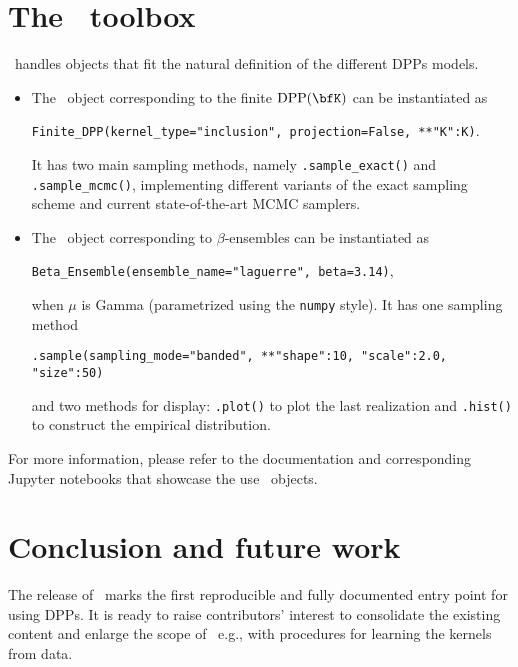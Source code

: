 \documentclass[twoside,11pt]{article}
\begin{document}

\section{The \DPPy\ toolbox} %
\label{sec:the_dppy_toolbox}

  \DPPy\ handles objects that fit the natural definition of the different DPPs models.
  \begin{itemize}
	  \item The \DPPy\ object corresponding to the finite $\DPP(\bfK)$ can be instantiated as
	  \begin{nscenter}
	  	\texttt{Finite_DPP(kernel_type="inclusion", projection=False, **{"K":K})}.
	  \end{nscenter}
		It has two main sampling methods, namely \texttt{.sample_exact()} and \texttt{.sample_mcmc()}, implementing different variants of the exact sampling scheme and current state-of-the-art MCMC samplers.

		\item The \DPPy\ object corresponding to $\beta$-ensembles can be instantiated as
		\begin{nscenter}
			\texttt{Beta_Ensemble(ensemble_name="laguerre", beta=3.14)},
		\end{nscenter}
		when $\mu$ is Gamma (parametrized using the \texttt{numpy} style).
		It has one sampling method
		\begin{nscenter}
			\texttt{.sample(sampling_mode="banded", **{"shape":10, "scale":2.0, "size":50})}
		\end{nscenter}
		and two methods for display: \texttt{.plot()} to plot the last realization and \texttt{.hist()} to construct the empirical distribution.
  \end{itemize}

  For more information, please refer to the documentation and corresponding Jupyter notebooks that showcase the use \DPPy\ objects.


\section{Conclusion and future work} %
\label{sec:conclusion_and_future_work}

	The release of \DPPy\ marks the first reproducible and fully documented entry point for using DPPs. It is ready to raise contributors' interest to consolidate the existing content and enlarge the scope of \DPPy\ e.g., with procedures for learning the kernels from data.
\end{document}
